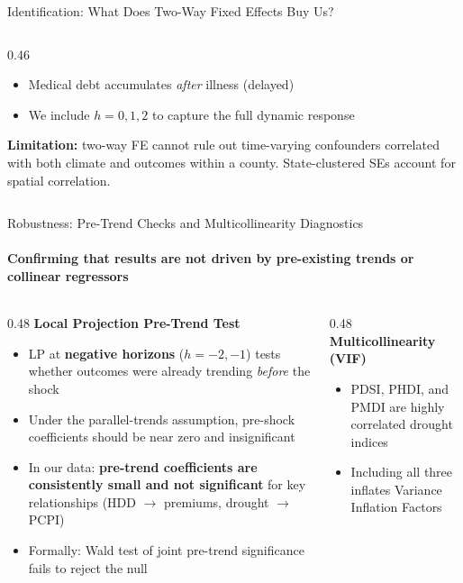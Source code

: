 \documentclass[aspectratio=169,11pt]{beamer}
\newcommand{\emphcolor}[1]{{\color{WarmOrange}\textbf{#1}}}
\newcommand{\tealtext}[1]{{\color{Teal}#1}}
\newcommand{\graytext}[1]{{\color{WarmGray}#1}}
\begin{document}
\begin{frame}{Identification: What Does Two-Way Fixed Effects Buy Us?}
\begin{columns}[T]
\begin{column}{0.46\textwidth}
\begin{itemize}
        \item Medical debt accumulates \emph{after} illness (delayed)
        \item We include $h = 0, 1, 2$ to capture the full dynamic response
      \end{itemize}
      \vspace{0.3em}
      \graytext{\scriptsize \textbf{Limitation:} two-way FE cannot rule out time-varying confounders correlated with both climate and outcomes within a county. State-clustered SEs account for spatial correlation.}
    \end{column}
  \end{columns}
\end{frame}

\begin{frame}[shrink=20]{Robustness: Pre-Trend Checks and Multicollinearity Diagnostics}
  \framesubtitle{Confirming that results are not driven by pre-existing trends or collinear regressors}
  \begin{columns}[T]
    \begin{column}{0.48\textwidth}
      \textbf{\tealtext{Local Projection Pre-Trend Test}}\\[0.2em]
      \footnotesize
      \begin{itemize}\itemsep0.15em
        \item LP at \emphcolor{negative horizons} ($h = -2, -1$) tests whether outcomes were already trending \emph{before} the shock
        \item Under the parallel-trends assumption, pre-shock coefficients should be near zero and insignificant
        \item In our data: \emphcolor{pre-trend coefficients are consistently small and not significant} for key relationships (HDD $\to$ premiums, drought $\to$ PCPI)
        \item Formally: Wald test of joint pre-trend significance fails to reject the null
      \end{itemize}
    \end{column}
    \begin{column}{0.48\textwidth}
      \textbf{\tealtext{Multicollinearity (VIF)}}\\[0.2em]
      \footnotesize
      \begin{itemize}\itemsep0.15em
        \item PDSI, PHDI, and PMDI are highly correlated drought indices
        \item Including all three inflates Variance Inflation Factors

\end{itemize}
\end{column}
\end{columns}
\end{frame}
\end{document}
